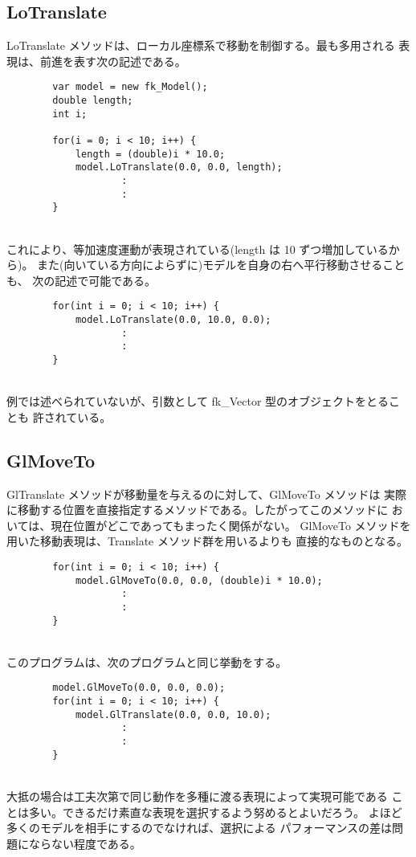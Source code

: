 \subsection{LoTranslate}
LoTranslate メソッドは、ローカル座標系で移動を制御する。最も多用される
表現は、前進を表す次の記述である。
\\
\begin{breakbox}
\begin{verbatim}
        var model = new fk_Model();
        double length;
        int i;

        for(i = 0; i < 10; i++) {
            length = (double)i * 10.0;
            model.LoTranslate(0.0, 0.0, length);
                    :
                    :
        }
\end{verbatim}
\end{breakbox}
~ \\
これにより、等加速度運動が表現されている(length は 10 ずつ増加しているから)。
また(向いている方向によらずに)モデルを自身の右へ平行移動させることも、
次の記述で可能である。
\\
\begin{breakbox}
\begin{verbatim}
        for(int i = 0; i < 10; i++) {
            model.LoTranslate(0.0, 10.0, 0.0);
                    :
                    :
        }
\end{verbatim}
\end{breakbox}
~ \\
例では述べられていないが、引数として fk\_Vector 型のオブジェクトをとることも
許されている。
\subsection{GlMoveTo}
GlTranslate メソッドが移動量を与えるのに対して、GlMoveTo メソッドは
実際に移動する位置を直接指定するメソッドである。したがってこのメソッドに
おいては、現在位置がどこであってもまったく関係がない。
GlMoveTo メソッドを用いた移動表現は、Translate メソッド群を用いるよりも
直接的なものとなる。
\\
\begin{breakbox}
\begin{verbatim}
        for(int i = 0; i < 10; i++) {
            model.GlMoveTo(0.0, 0.0, (double)i * 10.0);
                    :
                    :
        }
\end{verbatim}
\end{breakbox}
~ \\
このプログラムは、次のプログラムと同じ挙動をする。
\\
\begin{breakbox}
\begin{verbatim}
        model.GlMoveTo(0.0, 0.0, 0.0);
        for(int i = 0; i < 10; i++) {
            model.GlTranslate(0.0, 0.0, 10.0);
                    :
                    :
        }
\end{verbatim}
\end{breakbox}
~ \\
大抵の場合は工夫次第で同じ動作を多種に渡る表現によって実現可能である
ことは多い。できるだけ素直な表現を選択するよう努めるとよいだろう。
よほど多くのモデルを相手にするのでなければ、選択による
パフォーマンスの差は問題にならない程度である。

